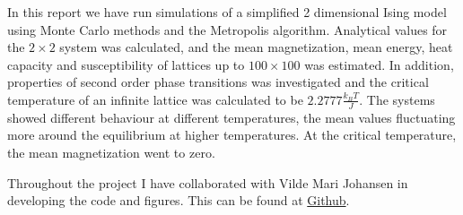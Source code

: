 

In this report we have run simulations of a simplified 2 dimensional Ising model  using Monte Carlo methods and the Metropolis algorithm.  Analytical values for the $ 2\times 2 $ system was calculated, and the mean magnetization, mean energy, heat capacity and susceptibility of lattices up to $ 100 \times 100 $ was estimated. In addition, properties of second order phase transitions was investigated and the critical temperature of an infinite lattice was calculated to be $  2.2777  \frac{k_BT}{J}   $. The systems showed different behaviour at different temperatures, the mean values fluctuating more around the equilibrium at higher temperatures. At the critical temperature, the mean magnetization went to zero. 


Throughout the project I have collaborated with Vilde Mari Johansen in developing the code and figures. This can be found at \href{https://github.com/kjetka/Project4}{Github}. 
